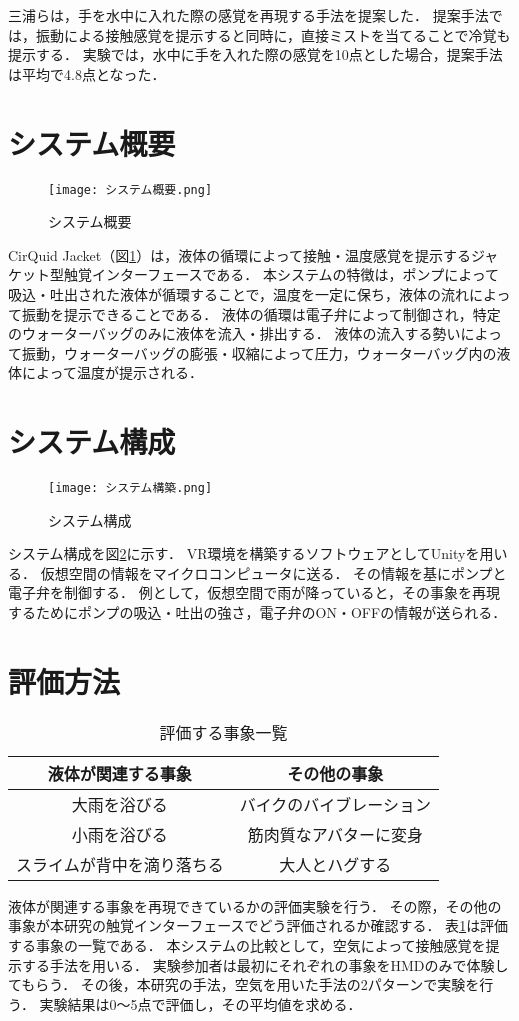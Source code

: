 \documentclass[uplatex]{jsarticle}   %
\begin{document}
三浦ら\cite{ty2}は，手を水中に入れた際の感覚を再現する手法を提案した．
提案手法では，振動による接触感覚を提示すると同時に，直接ミストを当てることで冷覚も提示する．
実験では，水中に手を入れた際の感覚を10点とした場合，提案手法は平均で4.8点となった．

\section{システム概要}
\begin{figure}[htbp]
    \centering
    \texttt{[image: システム概要.png]}
    \caption{システム概要}
    \label{fig:env}
\end{figure}
CirQuid Jacket（図\ref{fig:env}）は，液体の循環によって接触・温度感覚を提示するジャケット型触覚インターフェースである．
本システムの特徴は，ポンプによって吸込・吐出された液体が循環することで，温度を一定に保ち，液体の流れによって振動を提示できることである．
液体の循環は電子弁によって制御され，特定のウォーターバッグのみに液体を流入・排出する．
液体の流入する勢いによって振動，ウォーターバッグの膨張・収縮によって圧力，ウォーターバッグ内の液体によって温度が提示される．

\section{システム構成}
\begin{figure}[htbp]
    \centering
    \texttt{[image: システム構築.png]}
    \caption{システム構成}
    \label{fig:sys}
\end{figure}
システム構成を図\ref{fig:sys}に示す．
VR環境を構築するソフトウェアとしてUnityを用いる．
仮想空間の情報をマイクロコンピュータに送る．
その情報を基にポンプと電子弁を制御する．
例として，仮想空間で雨が降っていると，その事象を再現するためにポンプの吸込・吐出の強さ，電子弁のON・OFFの情報が送られる．

\section{評価方法}
\begin{table}[H]
    \centering
    \caption{評価する事象一覧}\label{tb:fuga}
    \begin{tabular}{c|c}\hline
    液体が関連する事象 & その他の事象  \\ \hline
    大雨を浴びる & バイクのバイブレーション  \\
    小雨を浴びる & 筋肉質なアバターに変身  \\
    スライムが背中を滴り落ちる & 大人とハグする  \\ \hline
    \end{tabular}
\end{table}
液体が関連する事象を再現できているかの評価実験を行う．
その際，その他の事象が本研究の触覚インターフェースでどう評価されるか確認する．
表\ref{tb:fuga}は評価する事象の一覧である．
本システムの比較として，空気によって接触感覚を提示する手法を用いる．
実験参加者は最初にそれぞれの事象をHMDのみで体験してもらう．
その後，本研究の手法，空気を用いた手法の2パターンで実験を行う．
実験結果は0～5点で評価し，その平均値を求める．
\end{document}
